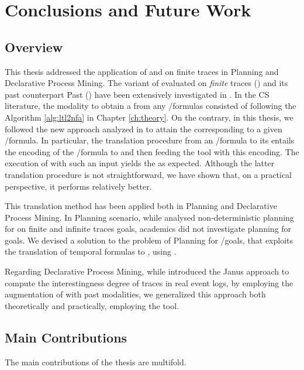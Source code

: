 \chapter{Conclusions and Future Work}\label{ch:conclusion}
\section{Overview}
This thesis addressed the application of \LTL and \PLTL on finite traces in Planning and Declarative Process Mining. The variant of \LTL evaluated on \textit{finite} traces (\LTLf) and its past counterpart  Past \LTL (\PLTL) have been extensively investigated in \cite{de2013linear,lichtenstein1985glory}. In the CS literature, the modality to obtain a \DFA from any \LTLf/\PLTL formulas consisted of following the Algorithm \ref{alg:ltl2nfa} in Chapter \ref{ch:theory}. On the contrary, in this thesis, we followed the new approach analyzed in \cite{zhu2017symbolic, zpv2018} to attain the corresponding \DFA to a given \LTLf/\PLTL formula. In particular, the translation procedure from an \LTLf/\PLTL formula to its \DFA entails the encoding of the \LTLf/\PLTL formula to \FOL and then feeding the \MONA tool with this encoding. The execution of \MONA with such an input yields the \DFA as expected. Although the latter translation procedure is not straightforward, we have shown that, on a practical perspective, it performs relatively better.

This translation method has been applied both in Planning and Declarative Process Mining. In Planning scenario, while \cite{camacho2017non} analysed non-deterministic planning for \LTL on finite and infinite traces goals, academics did not investigate planning for \PLTL goals. We devised a solution to the problem of Planning for \LTLf/\PLTL goals, that exploits the translation of temporal formulas to \DFA, using \LTLfToDFA. 

Regarding Declarative Process Mining, while \cite{cecconi2018interestingness} introduced the Janus approach to compute the interestingness degree of traces in real event logs, by employing the augmentation of \LTLf with past modalities, we generalized this approach both theoretically and practically, employing the \LTLfToDFA tool.
\section{Main Contributions}
The main contributions of the thesis are multifold.

